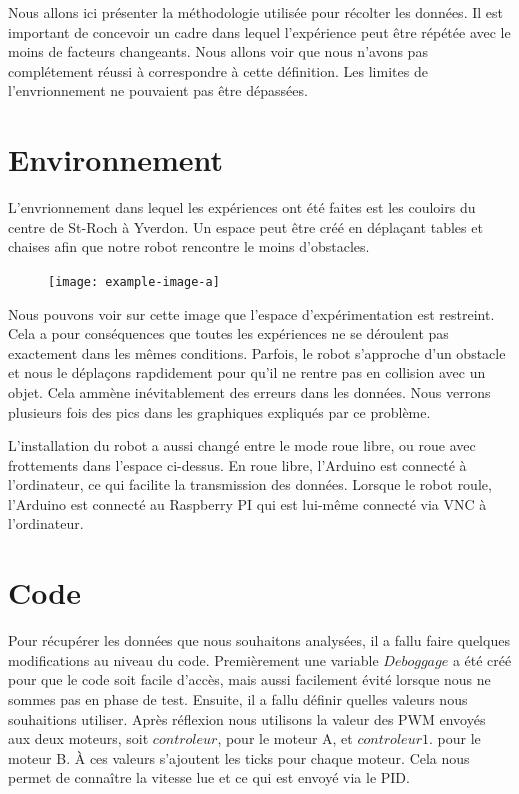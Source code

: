 \documentclass[
	a4paper,									%
	11pt,										%
	twoside,									%
	openright,									%
	notitlepage,									%
	parskip=half,								%
]{scrreprt}										%
\begin{document}
Nous allons ici présenter la méthodologie utilisée pour récolter les données. Il est important de concevoir un 
cadre dans lequel l'expérience peut être répétée avec le moins de facteurs changeants. Nous allons voir que 
nous n'avons pas complétement réussi à correspondre à cette définition. Les limites de l'envrionnement ne 
pouvaient pas être dépassées. \par

\section{Environnement}

L'envrionnement dans lequel les expériences ont été faites est les couloirs du centre de St-Roch à Yverdon. 
Un espace peut être créé en déplaçant tables et chaises afin que notre robot rencontre le moins d'obstacles. 

\begin{figure}[!ht]
	\centering
	\texttt{[image: example-image-a]}
	\vspace{.5cm}
	\label{img:img1}
\end{figure}

Nous pouvons voir sur cette image que l'espace d'expérimentation est restreint. Cela a pour conséquences que toutes les 
expériences ne se déroulent pas exactement dans les mêmes conditions. Parfois, le robot s'approche d'un obstacle et nous le déplaçons 
rapdidement pour qu'il ne rentre pas en collision avec un objet. 
Cela ammène inévitablement des erreurs dans les données. Nous verrons plusieurs fois des pics dans les graphiques expliqués
par ce problème. \par

L'installation du robot a aussi changé entre le mode roue libre, ou roue avec frottements dans l'espace ci-dessus. En roue libre, 
l'Arduino est connecté à l'ordinateur, ce qui facilite la transmission des données. Lorsque le robot roule, l'Arduino est connecté 
au Raspberry PI qui est lui-même connecté via VNC à l'ordinateur. \par

\section{Code}

Pour récupérer les données que nous souhaitons analysées, il a fallu faire quelques modifications au niveau du code. Premièrement 
une variable $Deboggage$ a été créé pour que le code soit facile d'accès, mais aussi facilement évité lorsque nous ne sommes pas 
en phase de test. Ensuite, il a fallu définir quelles valeurs nous souhaitions utiliser. Après réflexion nous utilisons la valeur
des PWM envoyés aux deux moteurs, soit $controleur$, pour le moteur A, et $controleur1$. pour le moteur B. À ces valeurs 
s'ajoutent les ticks pour chaque moteur. Cela nous permet de connaître la vitesse lue et ce qui est envoyé via le PID. \par
\end{document}
